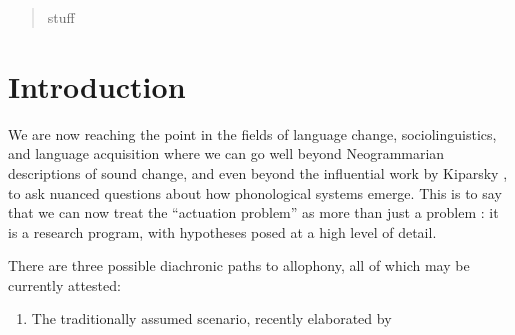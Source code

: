 \date{Received: date / Accepted: date}


\maketitle

\begin{abstract}
stuff
\end{abstract}

\section{Introduction}
\label{intro}

We are now reaching the point in the fields of language change, sociolinguistics, and language acquisition where we can go well beyond Neogrammarian descriptions of sound change, and even beyond the influential work by Kiparsky , to ask nuanced questions about how phonological systems emerge. This is to say that we can now treat the ``actuation problem'' as more than just a problem \citep{wlh1968}: it is a research program, with hypotheses posed at a high level of detail.

There are three possible diachronic paths to allophony, all of which may be currently attested:
\begin{enumerate}
    \item The traditionally assumed scenario, recently elaborated by 
\end{enumerate}




